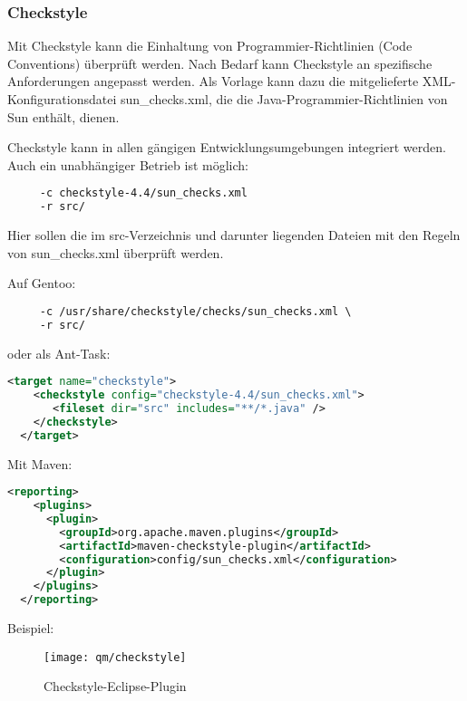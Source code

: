 \subsubsection{Checkstyle}
Mit Checkstyle kann die Einhaltung von Programmier-Richtlinien (Code
Conventions) überprüft werden. Nach Bedarf kann Checkstyle an spezifische
Anforderungen angepasst werden. Als Vorlage kann dazu die mitgelieferte
XML-Konfigurationsdatei sun\_checks.xml, die die Java-Programmier-Richtlinien
von Sun enthält, dienen.

\ifslides
\newpage
\fi
Checkstyle kann in allen gängigen Entwicklungsumgebungen integriert
 werden. Auch ein unabhängiger Betrieb ist möglich:
 \begin{lstlisting}[language=csh]
% java -jar checkstyle-all-4.4.jar \
     -c checkstyle-4.4/sun_checks.xml
     -r src/
 \end{lstlisting}
Hier sollen die im src-Verzeichnis und darunter liegenden Dateien mit den
 Regeln von sun\_checks.xml überprüft werden.

Auf Gentoo:
 \begin{lstlisting}[language=csh]
% checkstyle \
     -c /usr/share/checkstyle/checks/sun_checks.xml \
     -r src/
 \end{lstlisting}
\newslide
oder als Ant-Task:
\begin{lstlisting}[language=xml]
  <target name="checkstyle">
    <checkstyle config="checkstyle-4.4/sun_checks.xml">
       <fileset dir="src" includes="**/*.java" />
    </checkstyle>
  </target>
\end{lstlisting}
\newslide
Mit Maven:
\begin{lstlisting}[language=xml,
  morekeywords={reporting,plugins,plugin,groupId,artifactId,configuration}]
  <reporting>
    <plugins>
      <plugin>
        <groupId>org.apache.maven.plugins</groupId>
        <artifactId>maven-checkstyle-plugin</artifactId>
        <configuration>config/sun_checks.xml</configuration>
      </plugin>
    </plugins>
  </reporting>
\end{lstlisting}
\newpage
Beispiel:
\begin{figure}[H]
\texttt{[image: qm/checkstyle]}
\caption{Checkstyle-Eclipse-Plugin}
\end{figure}
%
\newslide
